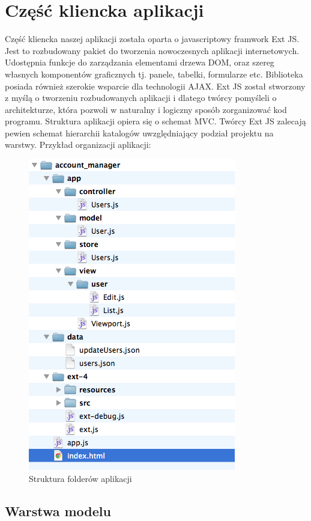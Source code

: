 \chapter{Część kliencka aplikacji}

Część kliencka naszej aplikacji została oparta o javascriptowy framwork Ext JS. Jest to rozbudowany pakiet do tworzenia nowoczesnych aplikacji internetowych. Udostępnia funkcje do zarządzania elementami drzewa DOM, oraz szereg własnych komponentów graficznych tj. panele, tabelki, formularze etc. Biblioteka posiada również szerokie wsparcie dla technologii AJAX. Ext JS został stworzony z myślą o tworzeniu rozbudowanych aplikacji i dlatego twórcy pomyśleli o architekturze, która pozwoli w naturalny i logiczny sposób zorganizować kod programu. Struktura aplikacji opiera się o schemat MVC. Twórcy Ext JS zalecają pewien schemat hierarchii katalogów uwzględniający podział projektu na warstwy. Przykład organizacji aplikacji:

\begin{figure}[h]
	\centering
	\includegraphics[scale=0.7]{images/struktura_folderow.png}
	\caption{Struktura folderów aplikacji}
\end{figure}

\section{Warstwa modelu}

